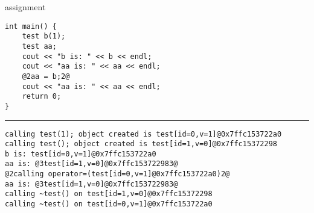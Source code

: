 \begin{frame}[fragile,label=testassign]{assignment}
\begin{lstlisting}
int main() {
    test b(1);
    test aa;
    cout << "b is: " << b << endl;
    cout << "aa is: " << aa << endl;
    @2aa = b;2@
    cout << "aa is: " << aa << endl;
    return 0;
}
\end{lstlisting}
\hrule
{}
\begin{lstlisting}
calling test(1); object created is test[id=0,v=1]@0x7ffc153722a0
calling test(); object created is test[id=1,v=0]@0x7ffc15372298
b is: test[id=0,v=1]@0x7ffc153722a0
aa is: @3test[id=1,v=0]@0x7ffc153722983@
@2calling operator=(test[id=0,v=1]@0x7ffc153722a0)2@
aa is: @3test[id=1,v=0]@0x7ffc153722983@
calling ~test() on test[id=1,v=0]@0x7ffc15372298
calling ~test() on test[id=0,v=1]@0x7ffc153722a0
\end{lstlisting}
\end{frame}
